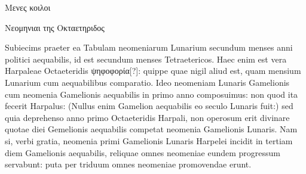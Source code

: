 \begin{table}[htbp]
 \centering
 \footnotesize
 \renewcommand{\arraystretch}{1.3}
 
 \caption{\textgreek{Μενες κοιλοι}}
 \label{tab:menes_koiloi}
\end{table}

\begin{table}[htbp]
 \centering
 \scriptsize
 \renewcommand{\arraystretch}{1.8}
 \setlength{\tabcolsep}{2.0pt}
 
 \caption{\textgreek{Νεομηνιαι της Οκταετηριδος}}
 \label{tab:neomeniai_tes_oktaeteridos}
\end{table}

Subiecims praeter ea Tabulam neomeniarum Lunarium secundum
menses anni politici aequabilis, id est secundum menses Tetraetericos.
Haec enim est vera Harpaleae Octaeteridis \textgreek{ψηφοφορία[?]}:
 quippe
quae nigil aliud est, quam mensium Lunarium cum aequabilibus
comparatio.
Ideo neomeniam Lunaris Gamelionis cum neomenia
Gamelionis aequabilis in primo anno composuimus: non quod
ita fecerit Harpalus: (Nullus enim Gamelion aequabilis eo seculo
Lunaris fuit:) sed quia deprehenso anno primo Octaeteridis Harpali,
non operosum erit divinare quotae diei Gemelionis aequabilis
competat neomenia Gamelionis Lunaris.
Nam si, verbi gratia,
neomenia primi Gamelionis Lunaris Harpelei incidit in tertiam
diem Gamelionis aequabilis, reliquae omnes neomeniae eundem progressum
servabunt: puta per triduum omnes neomeniae promovendae
erunt.

